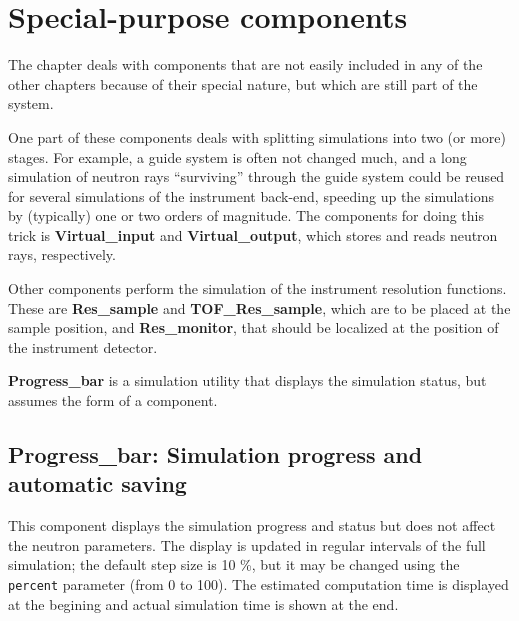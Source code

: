 \chapter{Special-purpose components}

The chapter deals with components that are not easily included
in any of the other chapters because of their special nature,
but which are still part of the \MCS system.

One part of these components deals with splitting simulations
into two (or more) stages. For example, a guide system is often
not changed much, and a long simulation of neutron rays
``surviving'' through the guide system could be reused
for several simulations of the instrument back-end, speeding up
the simulations by (typically) one or two orders of magnitude.
The components for doing this trick is \textbf{Virtual\_input} and
\textbf{Virtual\_output}, which stores and reads neutron rays, respectively.

Other components perform the simulation of the instrument
resolution functions. These are \textbf{Res\_sample} and \textbf{TOF\_Res\_sample},
which are to be
placed at the sample position, and \textbf{Res\_monitor}, that should
be localized at the position of the instrument detector.

\textbf{Progress\_bar} is a simulation utility that displays the simulation
status, but assumes the form of a component.

\newpage




\newpage






\newpage
\section{Progress\_bar: Simulation progress and automatic saving}
\label{s:progress-bar}

This component displays the simulation progress and status
but does not affect the neutron parameters.
The display is updated in regular intervals of the full simulation;
the default step size is 10 \%, but it may be changed using
the \verb+percent+ parameter (from 0 to 100).
The estimated computation time is displayed at the begining
and actual simulation time is shown at the end.

